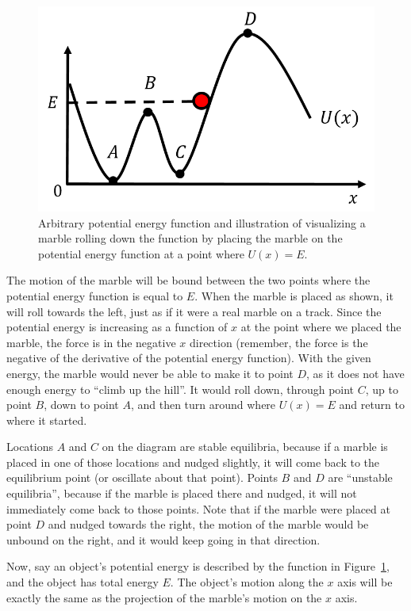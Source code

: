 \begin{figure}[!htbp]
\centering
\includegraphics[width=0.6\linewidth]{files/potential-e092acd863f57ea581351938e0c3506c.png}
\caption[]{Arbitrary potential energy function and illustration of visualizing a marble rolling down the function by placing the marble on the potential energy function at a point where $U(x)=E$.}
\label{fig:potentialecons:potential}
\end{figure}

The motion of the marble will be bound between the two points where the potential energy function is equal to $E$. When the marble is placed as shown, it will roll towards the left, just as if it were a real marble on a track. Since the potential energy is increasing as a function of $x$ at the point where we placed the marble, the force is in the negative $x$ direction (remember, the force is the negative of the derivative of the potential energy function). With the given energy, the marble would never be able to make it to point $D$, as it does not have enough energy to ``climb up the hill''. It would roll down, through point $C$, up to point $B$, down to point $A$, and then turn around where $U(x)=E$ and return to where it started.

Locations $A$ and $C$ on the diagram are stable equilibria, because if a marble is placed in one of those locations and nudged slightly, it will come back to the equilibrium point (or oscillate about that point). Points $B$ and $D$ are ``unstable equilibria'', because if the marble is placed there and nudged, it will not immediately come back to those points. Note that if the marble were placed at point $D$ and nudged towards the right, the motion of the marble would be unbound on the right, and it would keep going in that direction.

Now, say an object's potential energy is described by the function in Figure~\ref{fig:potentialecons:potential}, and the object has total energy $E$. The object's motion along the $x$ axis will be exactly the same as the projection of the marble's motion on the $x$ axis.

